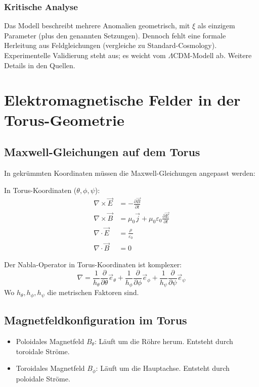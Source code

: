 	\subsubsection{Kritische Analyse}
	
	Das Modell beschreibt mehrere Anomalien geometrisch, mit $\xi$ als einzigem Parameter (plus den genannten Setzungen). Dennoch fehlt eine formale Herleitung aus Feldgleichungen (vergleiche zu Standard-Cosmology). Experimentelle Validierung steht aus; es weicht vom $\Lambda$CDM-Modell ab. Weitere Details in den Quellen.
	\section{Elektromagnetische Felder in der Torus-Geometrie}
	\subsection{Maxwell-Gleichungen auf dem Torus}
	In gekrümmten Koordinaten müssen die Maxwell-Gleichungen angepasst werden:
	
	In Torus-Koordinaten (\( \theta, \phi, \psi \)):
	\begin{align}
		\nabla \times \vec{E} &= -\frac{\partial \vec{B}}{\partial t} \\
		\nabla \times \vec{B} &= \mu_0 \vec{j} + \mu_0 \varepsilon_0 \frac{\partial \vec{E}}{\partial t} \\
		\nabla \cdot \vec{E} &= \frac{\rho}{\varepsilon_0} \\
		\nabla \cdot \vec{B} &= 0
	\end{align}
	
	Der Nabla-Operator in Torus-Koordinaten ist komplexer:
	\[
	\nabla = \frac{1}{h_\theta} \frac{\partial}{\partial \theta} \vec{e}_\theta + \frac{1}{h_\phi} \frac{\partial}{\partial \phi} \vec{e}_\phi + \frac{1}{h_\psi} \frac{\partial}{\partial \psi} \vec{e}_\psi
	\]
	Wo \( h_\theta, h_\phi, h_\psi \) die metrischen Faktoren sind.
	
	\subsection{Magnetfeldkonfiguration im Torus}
	\begin{itemize}
		\item Poloidales Magnetfeld \( B_\theta \):
		Läuft um die Röhre herum. Entsteht durch toroidale Ströme.
		\item Toroidales Magnetfeld \( B_\phi \):
		Läuft um die Hauptachse. Entsteht durch poloidale Ströme.
	\end{itemize}
	
